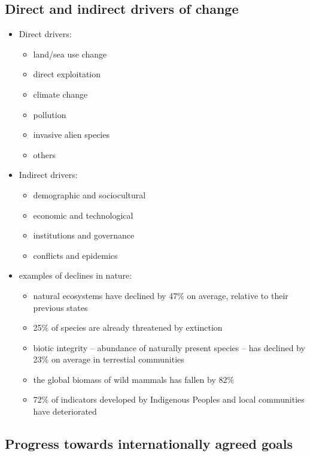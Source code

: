 \subsection{Direct and indirect drivers of change}


\begin{itemize}
	\item Direct drivers:
		\begin{itemize}
			\item land/sea use change
			\item direct exploitation
			\item climate change
			\item pollution
			\item invasive alien species
			\item others
		\end{itemize}
	\item Indirect drivers:
		\begin{itemize}
			\item demographic and sociocultural
			\item economic and technological
			\item institutions and governance
			\item conflicts and epidemics
		\end{itemize}
	\item examples of declines in nature:
		\begin{itemize}
			\item natural ecosystems have declined by 47\%
				on average, relative to their previous states
			\item 25\% of species are already threatened by
				extinction
			\item biotic integrity -- abundance of naturally
				present species -- has declined by 23\% on
				average in terrestial communities
			\item the global biomass of wild mammals has fallen by
				82\% 
			\item 72\% of indicators developed by Indigenous
				Peoples and local communities have deteriorated
		\end{itemize}
\end{itemize}

\subsection{Progress towards internationally agreed goals}

